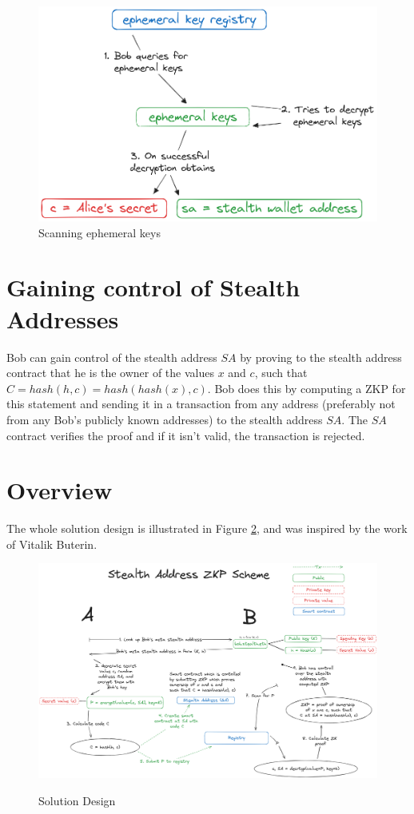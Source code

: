 \begin{figure}[h]
    \centering
    \includegraphics[scale=0.3]{assets/images/ephemeral-keys.png}
    \caption{Scanning ephemeral keys}
    \label{fig:scanning-ephemeral-keys}
    \vspace{0.5cm}
\end{figure}

\section{Gaining control of Stealth Addresses}

Bob can gain control of the stealth address $SA$ by proving to the stealth
address contract that he is the owner of the values $x$ and $c$, such that\\
$C = hash(h, c) = hash(hash(x), c)$. Bob does this by computing a ZKP for 
this statement and sending it in a transaction from any address (preferably
not from any Bob's publicly known addresses) to the stealth address $SA$. The
$SA$ contract verifies the proof and if it isn't valid, the transaction is
rejected.

\section{Overview}

The whole solution design is illustrated in Figure \ref{fig:solution},
and was inspired by the work of Vitalik Buterin\cite{ButerinIncompleteGuide}.

\begin{figure}[h]
    \centering
    \includegraphics[scale=0.15]{assets/images/solution.png}
    \caption{Solution Design}
	\cite{ButerinIncompleteGuide}
    \label{fig:solution}
    \vspace{0.5cm}
\end{figure}

